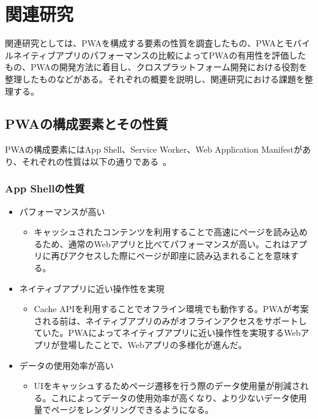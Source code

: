\section{関連研究}\label{section:関連研究}
関連研究としては、PWAを構成する要素の性質を調査したもの、PWAとモバイルネイティブアプリのパフォーマンスの比較によってPWAの有用性を評価したもの、PWAの開発方法に着目し、クロスプラットフォーム開発における役割を整理したものなどがある。それぞれの概要を説明し、関連研究における課題を整理する。
\subsection{PWAの構成要素とその性質}\label{subsection:PWAの構成要素とその性質}
PWAの構成要素にはApp Shell、Service Worker、Web Application Manifestがあり、それぞれの性質は以下の通りである~\cite{Tandel2018ProgressiveWebApps}。
\subsubsection{App Shellの性質}\label{subsubsection:App Shellの性質}
\begin{itemize}
    \item パフォーマンスが高い
    \begin{itemize}
      \item キャッシュされたコンテンツを利用することで高速にページを読み込めるため、通常のWebアプリと比べてパフォーマンスが高い。これはアプリに再びアクセスした際にページが即座に読み込まれることを意味する。
    \end{itemize}
    \item ネイティブアプリに近い操作性を実現
    \begin{itemize}
        \item Cache APIを利用することでオフライン環境でも動作する。PWAが考案される前は、ネイティブアプリのみがオフラインアクセスをサポートしていた。PWAによってネイティブアプリに近い操作性を実現するWebアプリが登場したことで、Webアプリの多様化が進んだ。
    \end{itemize}
    \item データの使用効率が高い
    \begin{itemize}
        \item UIをキャッシュするためページ遷移を行う際のデータ使用量が削減される。これによってデータの使用効率が高くなり、より少ないデータ使用量でページをレンダリングできるようになる。
    \end{itemize}
\end{itemize}
